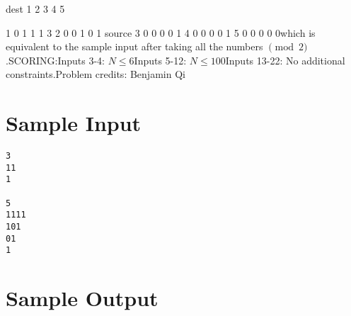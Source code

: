 \documentclass[12pt]{article}
\begin{document}
            dest
          1 2 3 4 5

       1  0 1 1 1 3 
       2  0 0 1 0 1 
source 3  0 0 0 0 1 
       4  0 0 0 0 1 
       5  0 0 0 0 0which is equivalent to the sample input after taking all the numbers $\pmod{2}$.SCORING:Inputs 3-4: $N\le 6$Inputs 5-12: $N\le 100$Inputs 13-22: No additional constraints.Problem credits: Benjamin Qi

\section*{Sample Input}
\begin{verbatim}
3
11
1

5
1111
101
01
1
\end{verbatim}

\section*{Sample Output}
\end{document}
